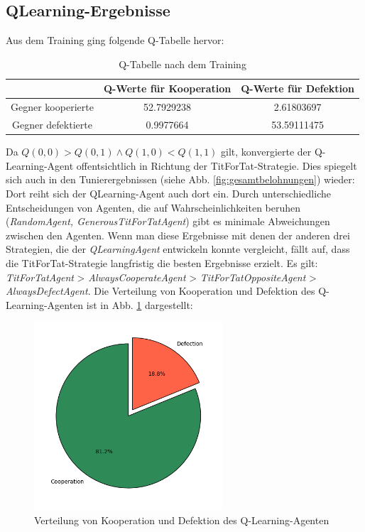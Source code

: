 \subsection{QLearning-Ergebnisse}
Aus dem Training ging folgende Q-Tabelle hervor:
\begin{table}[H]
    \centering
    \begin{tabular}{c|c|c}
            & Q-Werte für Kooperation & Q-Werte für Defektion \\
        \hline
        Gegner kooperierte &  52.7929238 & 2.61803697\\
        \hline
        Gegner defektierte &  0.9977664 & 53.59111475 \\
    \end{tabular}
    \caption{Q-Tabelle nach dem Training}
    \label{table:qtableaftertraining}
\end{table}
Da $Q(0, 0) > Q(0, 1) \land Q(1, 0) < Q(1, 1)$ gilt, konvergierte der Q-Learning-Agent offentsichtlich in Richtung der
TitForTat-Strategie. Dies spiegelt sich auch in den Tunierergebnissen (siehe Abb. \ref{fig:gesamtbelohnungen}) wieder:
Dort reiht sich der QLearning-Agent auch dort ein. Durch unterschiedliche Entscheidungen von Agenten, die auf Wahrscheinlichkeiten 
beruhen (\textit{RandomAgent, \textit{GenerousTitForTatAgent}}) gibt es minimale Abweichungen zwischen den Agenten.
Wenn man diese Ergebnisse mit denen der anderen drei Strategien, die der \textit{QLearningAgent} entwickeln konnte vergleicht,
fällt auf, dass die TitForTat-Strategie langfristig die besten Ergebnisse erzielt. Es gilt:
\textit{TitForTatAgent} > \textit{AlwaysCooperateAgent} > \textit{TitForTatOppositeAgent} > \textit{AlwaysDefectAgent}.
Die Verteilung von Kooperation und Defektion des Q-Learning-Agenten ist in Abb. \ref{fig:qverteilung} dargestellt:
\begin{figure}[H]
    \centering
    \includegraphics[width=7cm]{../poster/logos/qPie.png}
    \caption{Verteilung von Kooperation und Defektion des Q-Learning-Agenten}
    \label{fig:qverteilung}
\end{figure}

